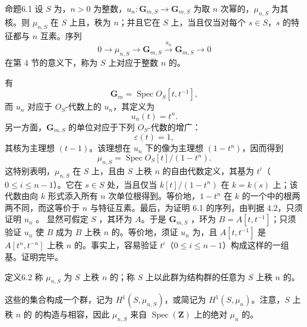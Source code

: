 \begin{SGAresult}{命题}{6.1}
设 $S$ 为，$n>0$ 为整数，$u_n:\mathbf G_{m,S}\to\mathbf G_{m,S}$ 为取 $n$ 次幂的，$\mu_{n,S}$ 为其核。则 $\mu_{n,S}$ 在 $S$ 上且，秩为 $n$；并且它在 $S$ 上，当且仅当对每个 $s\in S$，$s$ 的特征都与 $n$ 互素。序列
\[
0\longrightarrow\mu_{n,S}\longrightarrow\mathbf G_{m,S}
\xrightarrow{u_n}\mathbf G_{m,S}\longrightarrow0
\]
在第 4 节的意义下，称为 $S$ 上对应于整数 $n$ 的。
\end{SGAresult}
有
\[
\mathbf G_m=\operatorname{Spec}O_S[t,t^{-1}],
\]
而 $u_n$ 对应于 $O_S$-代数上的 $u_n$，其定义为
\[
u_n(t)=t^n.
\]
另一方面，$\mathbf G_{m,S}$ 的单位对应于下列 $O_S$-代数的增广：
\[
\varepsilon(t)=1,
\]
其核为主理想 $(t-1)$。该理想在 $u_n$ 下的像为主理想 $(1-t^n)$，因而得到
\[
\mu_{n,S}=\operatorname{Spec}O_S[t]/(1-t^n).
\]
这特别表明，$\mu_{n,S}$ 在 $S$ 上，且由 $S$ 上秩 $n$ 的自由代数定义，其基为 $t^i$（$0\leq i\leq n-1$）。它在 $s\in S$ 处，当且仅当 $k[t]/(1-t^n)$ 在 $k=k(s)$ 上；该代数由向 $k$ 形式添入所有 $n$ 次单位根得到。等价地，$1-t^n$ 在 $k$ 的一个中的根两两不同，而这等价于 $n$ 与特征互素。最后，为证明 6.1 的序列，由判据 4.2，只须证明 $u_n$ 。
显然可假定 $S$ ，其环为 $A$。于是 $\mathbf G_{m,S}$ ，环为 $B=A[t,t^{-1}]$；只须验证 $u_n$ 使 $B$ 成为 $B$ 上秩 $n$ 的。等价地，须证 $u_n$ 为，且 $A[t,t^{-1}]$ 是 $A[t^n,t^{-n}]$ 上秩 $n$ 的。事实上，容易验证 $t^i$（$0\leq i\leq n-1$）构成这样的一组基。证明完毕。

\begin{SGAresult}{定义}{6.2}
称 $\mu_{n,S}$ 为 $S$ 上秩 $n$ 的；称 $S$ 上以此群为结构群的任意为 $S$ 上秩 $n$ 的。
\end{SGAresult}
这些的集合构成一个群，记为 $H^1(S,\mu_{n,S})$，或简记为 $H^1(S,\mu_n)$。注意，$S$ 上秩 $n$ 的 的构造与相容，因此 $\mu_{n,S}$ 来自 $\operatorname{Spec}(\mathbf Z)$ 上的绝对  $\mu_n$ 的。

